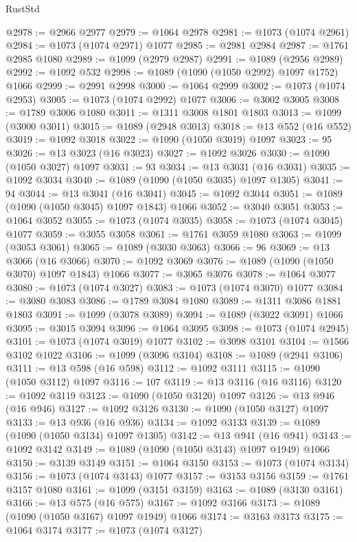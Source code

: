 \begin{lexlean}{RustStd}
\begin{coremodule}
@2978 := @2966 @2977
@2979 := @1064 @2978
@2981 := @1073 (@1074 @2961)
@2984 := @1073 (@1074 @2971) @1077
@2985 := @2981 @2984
@2987 := @1761 @2985 @1080
@2989 := @1099 (@2979 @2987)
@2991 := @1089 (@2956 @2989)
@2992 := @1092 @532
@2998 := @1089 (@1090 (@1050 @2992) @1097 @1752) @1066
@2999 := @2991 @2998
@3000 := @1064 @2999
@3002 := @1073 (@1074 @2953)
@3005 := @1073 (@1074 @2992) @1077
@3006 := @3002 @3005
@3008 := @1789 @3006 @1080
@3011 := @1311 @3008 @1801 @1803
@3013 := @1099 (@3000 @3011)
@3015 := @1089 (@2948 @3013)
@3018 := @13 @552 (@16 @552)
@3019 := @1092 @3018
@3022 := @1090 (@1050 @3019) @1097
@3023 := 95
@3026 := @13 @3023 (@16 @3023)
@3027 := @1092 @3026
@3030 := @1090 (@1050 @3027) @1097
@3031 := 93
@3034 := @13 @3031 (@16 @3031)
@3035 := @1092 @3034
@3040 := @1089 (@1090 (@1050 @3035) @1097 @1305)
@3041 := 94
@3044 := @13 @3041 (@16 @3041)
@3045 := @1092 @3044
@3051 := @1089 (@1090 (@1050 @3045) @1097 @1843) @1066
@3052 := @3040 @3051
@3053 := @1064 @3052
@3055 := @1073 (@1074 @3035)
@3058 := @1073 (@1074 @3045) @1077
@3059 := @3055 @3058
@3061 := @1761 @3059 @1080
@3063 := @1099 (@3053 @3061)
@3065 := @1089 (@3030 @3063)
@3066 := 96
@3069 := @13 @3066 (@16 @3066)
@3070 := @1092 @3069
@3076 := @1089 (@1090 (@1050 @3070) @1097 @1843) @1066
@3077 := @3065 @3076
@3078 := @1064 @3077
@3080 := @1073 (@1074 @3027)
@3083 := @1073 (@1074 @3070) @1077
@3084 := @3080 @3083
@3086 := @1789 @3084 @1080
@3089 := @1311 @3086 @1881 @1803
@3091 := @1099 (@3078 @3089)
@3094 := @1089 (@3022 @3091) @1066
@3095 := @3015 @3094
@3096 := @1064 @3095
@3098 := @1073 (@1074 @2945)
@3101 := @1073 (@1074 @3019) @1077
@3102 := @3098 @3101
@3104 := @1566 @3102 @1022
@3106 := @1099 (@3096 @3104)
@3108 := @1089 (@2941 @3106)
@3111 := @13 @598 (@16 @598)
@3112 := @1092 @3111
@3115 := @1090 (@1050 @3112) @1097
@3116 := 107
@3119 := @13 @3116 (@16 @3116)
@3120 := @1092 @3119
@3123 := @1090 (@1050 @3120) @1097
@3126 := @13 @946 (@16 @946)
@3127 := @1092 @3126
@3130 := @1090 (@1050 @3127) @1097
@3133 := @13 @936 (@16 @936)
@3134 := @1092 @3133
@3139 := @1089 (@1090 (@1050 @3134) @1097 @1305)
@3142 := @13 @941 (@16 @941)
@3143 := @1092 @3142
@3149 := @1089 (@1090 (@1050 @3143) @1097 @1949) @1066
@3150 := @3139 @3149
@3151 := @1064 @3150
@3153 := @1073 (@1074 @3134)
@3156 := @1073 (@1074 @3143) @1077
@3157 := @3153 @3156
@3159 := @1761 @3157 @1080
@3161 := @1099 (@3151 @3159)
@3163 := @1089 (@3130 @3161)
@3166 := @13 @575 (@16 @575)
@3167 := @1092 @3166
@3173 := @1089 (@1090 (@1050 @3167) @1097 @1949) @1066
@3174 := @3163 @3173
@3175 := @1064 @3174
@3177 := @1073 (@1074 @3127)

\end{coremodule}
\end{lexlean}
